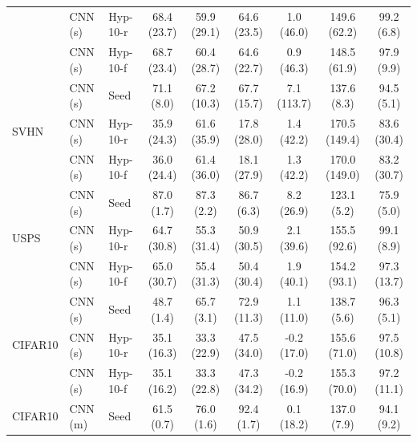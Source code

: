 \begin{table}[]
{{\begin{center}
\begin{tabular}{@{}lllcccccc@{}}
                               & CNN (s)   & Hyp-10-r   & 68.4 (23.7) & 59.9 (29.1)     & 64.6 (23.5)    & 1.0 (46.0)  & 149.6 (62.2)  & 99.2 (6.8)  \\
                               & CNN (s)   & Hyp-10-f    & 68.7 (23.4) & 60.4 (28.7)     & 64.6 (22.7)    & 0.9 (46.3)  & 148.5 (61.9)  & 97.9 (9.9)  \\
\cmidrule(r){1-1} \cmidrule(rl){2-2}  \cmidrule(rl){3-3} \cmidrule(rl){4-4} \cmidrule(rl){5-6} \cmidrule(rl){7-9}
\multirow{3}{*}{SVHN}          & CNN (s)   & Seed          & 71.1 (8.0)  & 67.2 (10.3)     & 67.7 (15.7)    & 7.1 (113.7) & 137.6 (8.3)   & 94.5 (5.1)  \\
                               & CNN (s)   & Hyp-10-r   & 35.9 (24.3) & 61.6 (35.9)     & 17.8 (28.0)    & 1.4 (42.2)  & 170.5 (149.4) & 83.6 (30.4) \\
                               & CNN (s)   & Hyp-10-f    & 36.0 (24.4) & 61.4 (36.0)     & 18.1 (27.9)    & 1.3 (42.2)  & 170.0 (149.0) & 83.2 (30.7) \\
\cmidrule(r){1-1} \cmidrule(rl){2-2}  \cmidrule(rl){3-3} \cmidrule(rl){4-4} \cmidrule(rl){5-6} \cmidrule(rl){7-9}
\multirow{3}{*}{USPS}          & CNN (s)   & Seed          & 87.0 (1.7)  & 87.3 (2.2)      & 86.7 (6.3)     & 8.2 (26.9)  & 123.1 (5.2)   & 75.9 (5.0)  \\
                               & CNN (s)   & Hyp-10-r   & 64.7 (30.8) & 55.3 (31.4)     & 50.9 (30.5)    & 2.1 (39.6)  & 155.5 (92.6)  & 99.1 (8.9)  \\
                               & CNN (s)   & Hyp-10-f    & 65.0 (30.7) & 55.4 (31.3)     & 50.4 (30.4)    & 1.9 (40.1)  & 154.2 (93.1)  & 97.3 (13.7) \\
\cmidrule(r){1-1} \cmidrule(rl){2-2}  \cmidrule(rl){3-3} \cmidrule(rl){4-4} \cmidrule(rl){5-6} \cmidrule(rl){7-9}
\multirow{3}{*}{CIFAR10}      & CNN (s)   & Seed          & 48.7 (1.4)  & 65.7 (3.1)      & 72.9 (11.3)    & 1.1 (11.0)  & 138.7 (5.6)   & 96.3 (5.1)  \\
                               & CNN (s)   & Hyp-10-r   & 35.1 (16.3) & 33.3 (22.9)     & 47.5 (34.0)    & -0.2 (17.0) & 155.6 (71.0)  & 97.5 (10.8) \\
                               & CNN (s)   & Hyp-10-f    & 35.1 (16.2) & 33.3 (22.8)     & 47.3 (34.2)    & -0.2 (16.9) & 155.3 (70.0)  & 97.2 (11.1) \\
\cmidrule(r){1-1} \cmidrule(rl){2-2}  \cmidrule(rl){3-3} \cmidrule(rl){4-4} \cmidrule(rl){5-6} \cmidrule(rl){7-9}
\multirow{3}{*}{CIFAR10}      & CNN (m)   & Seed          & 61.5 (0.7)  & 76.0 (1.6)      & 92.4 (1.7)     & 0.1 (18.2)  & 137.0 (7.9)   & 94.1 (9.2)  \\

\end{tabular}
\end{center}}}
\end{table}
